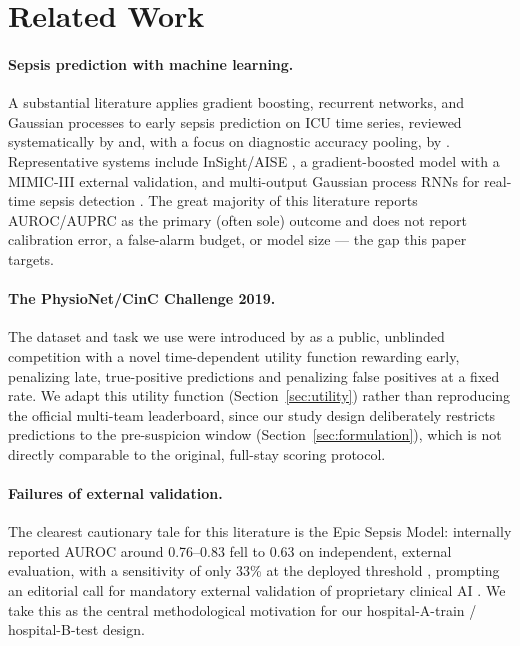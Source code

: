 \documentclass[11pt]{article}
\begin{document}
\section{Related Work}
\label{sec:related}

\paragraph{Sepsis prediction with machine learning.} A substantial literature applies gradient boosting, recurrent networks, and Gaussian processes to early sepsis prediction on ICU time series, reviewed systematically by \citet{moor2021early} and, with a focus on diagnostic accuracy pooling, by \citet{fleuren2020machine}. Representative systems include InSight/AISE \citep{nemati2018interpretable}, a gradient-boosted model with a MIMIC-III external validation, and multi-output Gaussian process RNNs for real-time sepsis detection \citep{futoma2017improved}. The great majority of this literature reports AUROC/AUPRC as the primary (often sole) outcome and does not report calibration error, a false-alarm budget, or model size --- the gap this paper targets.

\paragraph{The PhysioNet/CinC Challenge 2019.} The dataset and task we use were introduced by \citet{reyna2019early, reyna2019cinc} as a public, unblinded competition with a novel time-dependent utility function rewarding early, penalizing late, true-positive predictions and penalizing false positives at a fixed rate. We adapt this utility function (Section~\ref{sec:utility}) rather than reproducing the official multi-team leaderboard, since our study design deliberately restricts predictions to the pre-suspicion window (Section~\ref{sec:formulation}), which is not directly comparable to the original, full-stay scoring protocol.

\paragraph{Failures of external validation.} The clearest cautionary tale for this literature is the Epic Sepsis Model: internally reported AUROC around 0.76--0.83 fell to 0.63 on independent, external evaluation, with a sensitivity of only 33\% at the deployed threshold \citep{wong2021external}, prompting an editorial call for mandatory external validation of proprietary clinical AI \citep{habib2021epic}. We take this as the central methodological motivation for our hospital-A-train / hospital-B-test design.
\end{document}
